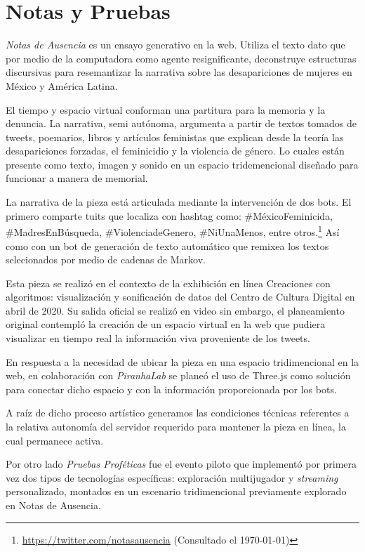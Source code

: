 
\section*{Notas y Pruebas} %


\textit{Notas de Ausencia} \citep{notasdeausencia} es un ensayo generativo en la web. Utiliza el texto dato que por medio de la computadora como agente resignificante, deconstruye estructuras discursivas para resemantizar la narrativa sobre las desapariciones de mujeres en México y América Latina.

El tiempo y espacio virtual conforman una partitura para la memoria y la denuncia. La narrativa, semi autónoma, argumenta a partir de textos tomados de tweets, poemarios, libros y artículos feministas que explican desde la teoría las desapariciones forzadas, el feminicidio y la violencia de género. Lo cuales están presente como texto, imagen y sonido en un espacio tridemencional diseñado para funcionar a manera de memorial.

La narrativa de la pieza está articulada mediante la intervención de dos bots. El primero comparte tuits que localiza con hashtag como: \#MéxicoFeminicida, \#MadresEnBúsqueda, \#ViolenciadeGenero, \#NiUnaMenos, entre otros.\footnote{\url{https://twitter.com/notasausencia} (Consultado el \today)} Así como con un bot de generación de texto automático que remixea los textos selecionados por medio de cadenas de Markov.

Esta pieza se realizó en el contexto de la exhibición en línea Creaciones con algoritmos: visualización y sonificación de datos del Centro de Cultura Digital en abril de 2020. Su salida oficial se realizó en video sin embargo, el planeamiento original contempló la creación de un espacio virtual en la web que pudiera visualizar en tiempo real la información viva proveniente de los tweets. 

En respuesta a la necesidad de ubicar la pieza en una espacio tridimencional en la web, en colaboración con \textit{PiranhaLab} se planeó el uso de Three.js como solución para conectar dicho espacio y con la información proporcionada por los bots. 

A raíz de dicho proceso artístico generamos las condiciones técnicas referentes a la relativa autonomía del servidor requerido para mantener la pieza en línea, la cual permanece activa.

Por otro lado \textit{Pruebas Proféticas} fue el evento piloto que implementó por primera vez dos tipos de tecnologías específicas: exploración multijugador y \textit{streaming} personalizado, montados en un escenario tridimencional previamente explorado en Notas de Ausencia. 

